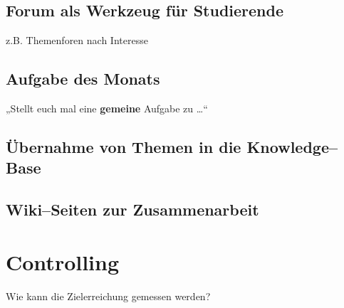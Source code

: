 \subsection{Forum als Werkzeug für Studierende} %
\label{sub:forum_als_werkzeug_fur_studierende}
z.B. Themenforen nach Interesse

\subsection{Aufgabe des Monats} %
\label{sub:aufgabe_des_monats}

„Stellt euch mal eine \textbf{gemeine} Aufgabe zu …“

\subsection{Übernahme von Themen in die Knowledge--Base} %
\label{sub:ubernahme_von_themen_in_die_knowledge_base}


\subsection{Wiki--Seiten zur Zusammenarbeit} %
\label{sub:wiki_seiten_zur_zusammenarbeit}



\section{Controlling} %
\label{sec:controlling}
Wie kann die Zielerreichung gemessen werden?
